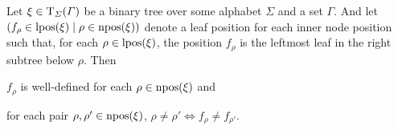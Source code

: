 \documentclass[../document.tex]{subfiles}
\begin{document}

    \begin{lemma}\label{lem:firstviasecond}
        Let \(\xi \in \operatorname{T}_{\varSigma}(\varGamma)\) be a binary tree over some alphabet \(\varSigma\) and a set \(\varGamma\).
        And let \((f_\rho \in \operatorname{lpos}(\xi) \mid \rho \in \operatorname{npos}(\xi))\) denote a leaf position for each inner node position such that, for each \(\rho \in \operatorname{lpos}(\xi)\), the position \(f_\rho\) is the leftmost leaf in the right subtree below \(\rho\).
        Then
        \begin{inparaenum}
            \item \(f_\rho\) is well-defined for each \(\rho \in \operatorname{npos}(\xi)\) and
            \item for each pair \(\rho, \rho' \in \operatorname{npos}(\xi)\), \(\rho \neq \rho' \iff f_\rho \neq f_{\rho'}\).
        \end{inparaenum}
    \end{lemma}

\end{document}
